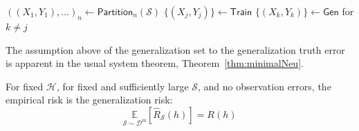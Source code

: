 \documentclass[
  journal=largetwo,
  year=2025,
  volume=37,
]{cup-journal}
\begin{document}
\begin{algorithm}[htb]
    \renewcommand{\algorithmcfname}{Optimization problem}
    \caption{Empirical-generalization learning dynamics (proxy)}
    \Begin
    {
        $((X_{1},Y_{1}),\dots)_{n}\gets\mathsf{Partition}_{n}(\mathcal{S})$\;
        $\{(X_{j},Y_{j})\}\gets \mathsf{Train}$\;
        $\{(X_{k},Y_{k})\}\gets \mathsf{Gen}$ for $k\ne j$\;
    }
    \label{algo:algo_optim_no_c}
\end{algorithm}
The assumption above of the generalization set to the generalization truth error is apparent in the usual system theorem, Theorem~\ref{thm:minimalNeu}.
\begin{theorem}[\cite{10.5555/2371238}]\label{thm:minimalNeu}
    For fixed $\mathcal{H}$, for fixed and sufficiently large $\mathcal{S}$, and no observation errors, the empirical risk is the generalization risk: \begin{equation}
        \underset{\mathcal{S}\sim \mathcal{D}^{m}}{\mathbb{E}}[\hat{R}_{\mathcal{S}}(h)]  = R(h)
    \end{equation} 
\end{theorem}
\end{document}
